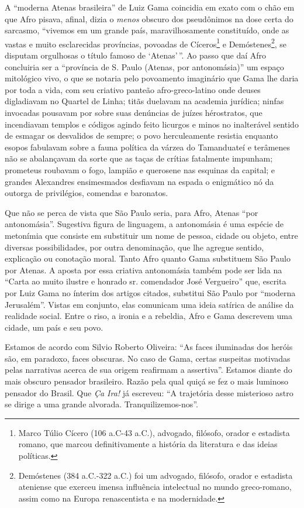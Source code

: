 A ``moderna Atenas brasileira'' de Luiz Gama coincidia em exato com o chão
em que Afro pisava, afinal, dizia o \emph{menos} obscuro dos
pseudônimos na dose certa do sarcasmo, ``vivemos em um grande país,
maravilhosamente constituído, onde as vastas e muito esclarecidas
províncias, povoadas de Cíceros\footnote{Marco Túlio Cícero (106
  a.C-43 a.C.), advogado, filósofo, orador e estadista romano, que
  marcou definitivamente a história da literatura e das ideias
  políticas.} e Demóstenes\footnote{Demóstenes (384 a.C.-322 a.C.) foi
  um advogado, filósofo, orador e estadista ateniense que exerceu imensa
  influência intelectual no mundo greco-romano, assim como na Europa
  renascentista e na modernidade.}, se disputam orgulhosas o título
famoso de `Atenas'\,''. Ao passo que daí Afro concluiria ser a
``província de S. Paulo (Atenas, por antonomásia)'' um espaço mitológico
vivo, o que se notaria pelo povoamento imaginário que Gama lhe daria por
toda a vida, com seu criativo panteão afro-greco-latino onde
deuses digladiavam no Quartel de Linha; titãs duelavam na
academia jurídica; ninfas invocadas pousavam por sobre suas
denúncias de juízes hérostratos, que incendiavam templos e
códigos agindo feito licurgos e minos no inalterável
sentido de esmagar os desvalidos de sempre; o povo herculeamente
resistia enquanto esopos fabulavam sobre a fauna política da
várzea do Tamanduateí e terâmenes não se abalançavam da sorte que
as taças de crítias fatalmente impunham; prometeus
roubavam o fogo, lampião e querosene nas esquinas da capital; e grandes
Alexandres ensimesmados desfiavam na espada o enigmático nó da
outorga de privilégios, comendas e baronatos.

Que não se perca de vista que São Paulo seria, para Afro, Atenas
``por antonomásia''. Sugestiva figura de linguagem, a antonomásia é uma
espécie de metonímia que consiste em substituir um nome de pessoa,
cidade ou objeto, entre diversas possibilidades, por outra denominação,
que lhe agregue sentido, explicação ou conotação moral. Tanto
Afro quanto Gama substituem São Paulo por Atenas. A aposta por
essa criativa antonomásia também pode ser lida na ``Carta ao muito
ilustre e honrado sr. comendador José Vergueiro'' que, escrita por Luiz
Gama no ínterim dos artigos citados, substitui São Paulo por ``moderna
Jerusalém''. Vistas em conjunto, elas comunicam uma ideia satírica de
análise da realidade social. Entre o riso, a ironia e a rebeldia,
Afro e Gama descrevem uma cidade, um país e seu povo.

Estamos de acordo com Silvio Roberto Oliveira: ``As faces iluminadas dos
heróis são, em paradoxo, faces obscuras. No caso de Gama, certas
suspeitas motivadas pelas narrativas acerca de sua origem reafirmam a
assertiva''. Estamos diante do mais obscuro pensador brasileiro. Razão
pela qual quiçá se fez o mais luminoso pensador do Brasil. Que \emph{Ça
Ira!} já escreveu: ``A trajetória desse misterioso astro se dirige a uma
grande alvorada. Tranquilizemos-nos''.
